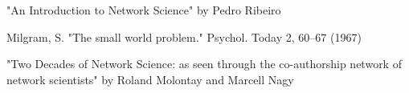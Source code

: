 \documentclass{article}
\begin{document}
\noindent "An Introduction to Network Science" by Pedro Ribeiro

\bigskip

\noindent Milgram, S. "The small world problem." Psychol. Today 2, 60–67 (1967)

\bigskip

\noindent "Two Decades of Network Science: as seen through the co-authorship network of network scientists" by Roland Molontay and Marcell Nagy




\end{document}
